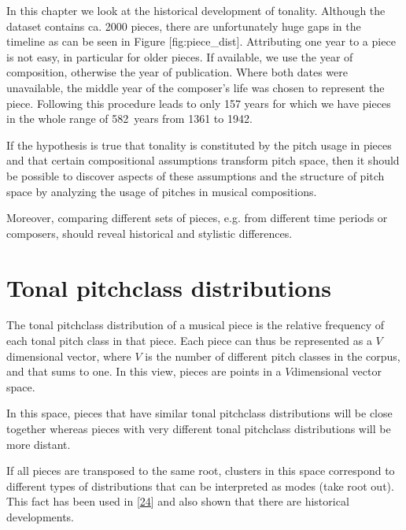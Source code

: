 \documentclass[letterpaper,10pt,english]{sphinxmanual}
\begin{document}
\sphinxAtStartPar
In this chapter we look at the historical development of tonality.
Although the dataset contains ca. 2000 pieces, there are unfortunately
huge gaps in the timeline as can be seen in Figure {[}fig:piece\_dist{]}.
Attributing one year to a piece is not easy, in particular for older
pieces. If available, we use the year of composition, otherwise the year
of publication. Where both dates were unavailable, the middle year of
the composer’s life was chosen to represent the piece. Following this
procedure leads to only 157 years for which we have pieces in the whole
range of 582 years from 1361 to 1942.

\sphinxAtStartPar
If the hypothesis is true that tonality is constituted by the pitch
usage in pieces and that certain compositional assumptions transform
pitch space, then it should be possible to discover aspects of these
assumptions and the structure of pitch space by analyzing the usage of
pitches in musical compositions.

\sphinxAtStartPar
Moreover, comparing different sets of pieces, e.g. from different time
periods or composers, should reveal historical and stylistic
differences.


\chapter{Tonal pitch\sphinxhyphen{}class distributions}
\label{\detokenize{pc_distributions:tonal-pitch-class-distributions}}\label{\detokenize{pc_distributions::doc}}
\sphinxAtStartPar
The tonal pitch\sphinxhyphen{}class distribution of a musical piece is the relative
frequency of each tonal pitch class in that piece. Each piece can thus
be represented as a \(V\)\sphinxhyphen{}dimensional vector, where \(V\) is the
number of different pitch classes in the corpus, and that sums to one.
In this view, pieces are points in a \(V\)\sphinxhyphen{}dimensional vector space.

\sphinxAtStartPar
In this space, pieces that have similar tonal pitch\sphinxhyphen{}class distributions
will be close together whereas pieces with very different tonal
pitch\sphinxhyphen{}class distributions will be more distant.

\sphinxAtStartPar
If all pieces are transposed to the same root, clusters in this space
correspond to different types of distributions that can be interpreted
as modes (take root out). This fact has been used in
{[}\hyperlink{cite.8_bibliography:id78}{24}{]}
and also shown that there are historical developments.
\end{document}
